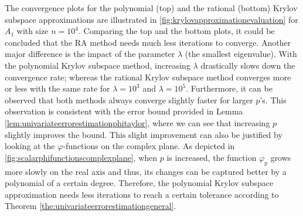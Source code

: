 The convergence plots for the polynomial (top) and the rational (bottom) Krylov subspace approximations are
illustrated in \autoref{fig:krylovapproximationevaluation} for $A_1$ with size $n=10^{4}$.
Comparing the top and the bottom plots, it could be concluded that the RA method needs
much less iterations to converge.
Another major difference is the impact of the parameter $\lambda$ (the smallest eigenvalue).
With the polynomial Krylov subspace method, increasing $\lambda$ drastically slows down the convergence rate;
whereas the rational Krylov subspace method converges more or less with the same rate for
$\lambda=10^{3}$ and $\lambda=10^{5}$.
Furthermore, it can be observed that both methods always converge slightly faster for
larger $p$'s. This observation is consistent with the error bound provided in Lemma
\ref{lem:univariateerrorestimationphitaylor}, where we can see that increasing $p$ slightly
improves the bound. This slight improvement can also be justified by looking at the
$\varphi$-functions on the complex plane. As depicted in
\autoref{fig:scalarphifunctionscomplexplane}, when $p$ is increased, the
function $\varphi_p$ grows more slowly on the real axis and thus, its changes can be
captured better by a polynomial of a certain degree.
Therefore, the polynomial Krylov subspace approximation needs less iterations to reach a certain
tolerance according to Theorem \ref{the:univariateerrorestimationgeneral}.

